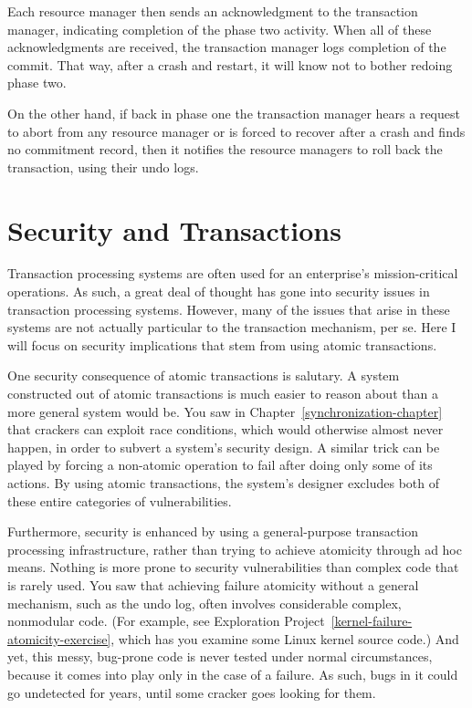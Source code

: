 \begin{enumerate}
Each resource manager then sends an acknowledgment to the transaction
manager, indicating completion of the phase two activity.  When all of
these acknowledgments are received, the transaction manager logs
completion of the commit.  That way, after a crash and restart, it
will know not to bother redoing phase two.
\end{enumerate}
On the other hand, if back in phase one the transaction manager hears
a request to abort from any resource manager or is forced to recover
after a crash and finds no commitment record, then it notifies the
resource managers to roll back the transaction, using their undo logs.

\section{Security and Transactions}\label{security-and-transactions-section}

Transaction processing systems are often used for an enterprise's
mission-critical operations.  As such, a great deal of thought has
gone into security issues in transaction processing systems.  However,
many of the issues that arise in these systems are not actually
particular to the transaction mechanism, per se.  Here I will
focus on security implications that stem from using atomic
transactions.

One security consequence of atomic transactions is salutary.  A system
constructed out of atomic transactions is much easier to reason about
than a more general system would be.  You saw in Chapter~\ref{synchronization-chapter} that
crackers can exploit race conditions, which would otherwise almost
never happen, in order to subvert a system's security design.  A
similar trick can be played by forcing a non-atomic operation to fail
after doing only some of its actions.  By using atomic transactions,
the system's designer excludes both of these entire categories of vulnerabilities.

Furthermore, security is enhanced by using a general-purpose
transaction processing infrastructure, rather than trying to achieve
atomicity through ad hoc means.  Nothing is more prone to
security vulnerabilities than complex code that is rarely used.  You
saw that achieving failure atomicity without a general mechanism, such
as the undo log, often involves considerable complex, nonmodular
code.  (For example, see
Exploration Project~\ref{kernel-failure-atomicity-exercise}, which
has you examine some Linux kernel source code.)  And yet, this messy,
bug-prone code is never tested under normal circumstances, because it
comes into play only in the case of a failure.  As such, bugs in it
could go undetected for years, until some cracker goes looking for
them.

